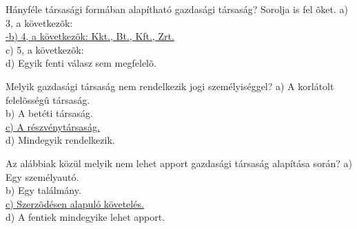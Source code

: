 \begin{frame}

\begin{tcolorbox}[title={67. Kérdés}]
Hányféle társasági formában alapítható gazdasági társaság? Sorolja is fel õket.
\tcblower
a) 3, a következõk:\\
\uline {-b) 4, a következõk: Kkt., Bt., Kft., Zrt.}\\
c) 5, a következõk:\\
d) Egyik fenti válasz sem megfelelõ.
\end{tcolorbox}

\begin{tcolorbox}[title={68. Kérdés}]
Melyik gazdasági társaság nem rendelkezik jogi személyiséggel?
\tcblower
a) A korlátolt felelõsségû társaság.\\
b) A betéti társaság.\\
\uline {c) A részvénytársaság.}\\
d) Mindegyik rendelkezik.
\end{tcolorbox}

\begin{tcolorbox}[title={69. Kérdés}]
Az alábbiak közül melyik nem lehet apport gazdasági társaság alapítása során?
\tcblower
a) Egy személyautó.\\
b) Egy találmány.\\
\uline {c) Szerzõdésen alapuló követelés.}\\
d) A fentiek mindegyike lehet apport.
\end{tcolorbox}

\end{frame}



